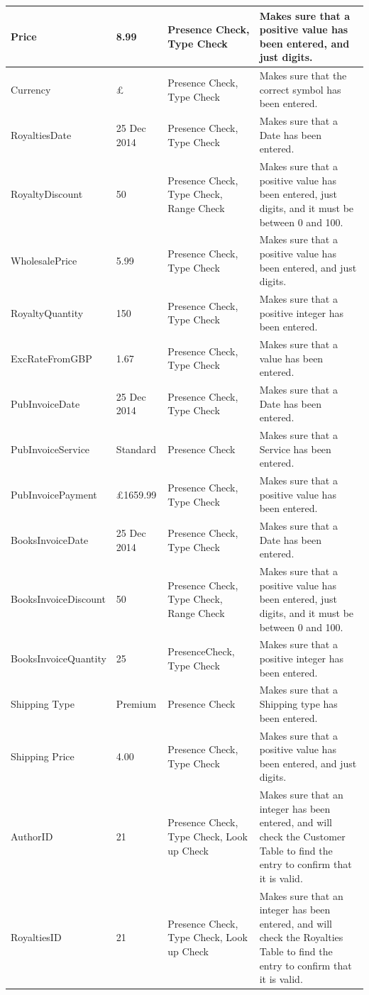 \begin{center}
\begin{tabular}{|p{2cm}|p{2cm}|p{2cm}|p{2cm}|}
    Price & 8.99 & Presence Check, Type Check & Makes sure that a positive value has been entered, and just digits. \\ \hline
    Currency & £ & Presence Check, Type Check & Makes sure that the correct symbol has been entered. \\ \hline
    RoyaltiesDate & 25 Dec 2014 & Presence Check, Type Check & Makes sure that a Date has been entered. \\ \hline
    RoyaltyDiscount & 50 & Presence Check, Type Check, Range Check & Makes sure that a positive value has been entered, just digits, and it must be between 0 and 100. \\ \hline
    WholesalePrice & 5.99 & Presence Check, Type Check & Makes sure that a positive value has been entered, and just digits. \\ \hline
    RoyaltyQuantity & 150 & Presence Check, Type Check & Makes sure that a positive integer has been entered. \\ \hline
    ExcRateFromGBP & 1.67 & Presence Check, Type Check & Makes sure that a value has been entered. \\ \hline
    PubInvoiceDate & 25 Dec 2014 & Presence Check, Type Check & Makes sure that a Date has been entered. \\ \hline
    PubInvoiceService & Standard & Presence Check & Makes sure that a Service has been entered. \\ \hline
    PubInvoicePayment & £1659.99 & Presence Check, Type Check & Makes sure that a positive value has been entered. \\ \hline
    BooksInvoiceDate & 25 Dec 2014 & Presence Check, Type Check & Makes sure that a Date has been entered. \\ \hline
    BooksInvoiceDiscount & 50 & Presence Check, Type Check, Range Check & Makes sure that a positive value has been entered, just digits, and it must be between 0 and 100. \\ \hline
    BooksInvoiceQuantity & 25 & PresenceCheck, Type Check & Makes sure that a positive integer has been entered. \\ \hline
    Shipping Type & Premium & Presence Check & Makes sure that a Shipping type has been entered. \\ \hline
    Shipping Price & 4.00 & Presence Check, Type Check & Makes sure that a positive value has been entered, and just digits. \\ \hline
    AuthorID & 21 & Presence Check, Type Check, Look up Check & Makes sure that an integer has been entered, and will check the Customer Table to find the entry to confirm that it is valid. \\ \hline 
    RoyaltiesID & 21 & Presence Check, Type Check, Look up Check & Makes sure that an integer has been entered, and will check the Royalties Table to find the entry to confirm that it is valid. \\ \hline

\end{tabular}
\end{center}
